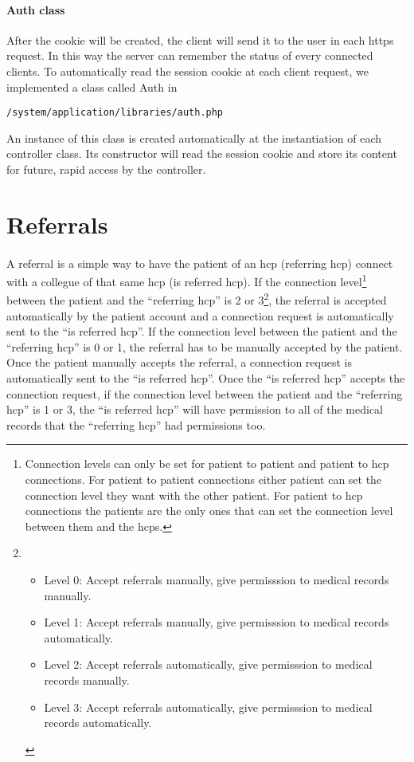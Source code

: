 \paragraph{Auth class}
After the cookie will be created, the client will send it to the user in each https request. In this way the server can remember the status of every connected clients. To automatically read the session cookie at each client request, we implemented a class called Auth in
\begin{verbatim}
/system/application/libraries/auth.php
\end{verbatim}
An instance of this class is created automatically at the instantiation of each controller class. Its constructor will read the session cookie and store its content for future, rapid access by the controller.

\section{Referrals}
\paragraph{}   A referral is a simple way to have the patient of an hcp (referring hcp) connect with a collegue of that same hcp (is referred hcp).  If the connection level\footnote{Connection levels can only be set for patient to patient and patient to hcp connections.  For patient to patient connections either patient can set the connection level they want with the other patient.  For patient to hcp connections the patients are the only ones that can set the connection level between them and the hcps.} between the patient and the ``referring hcp'' is 2 or 3\footnote{\begin{itemize} \item Level 0: Accept referrals manually, give permisssion to medical records manually.  \item Level 1: Accept referrals manually, give permisssion to medical records automatically.  \item Level 2: Accept referrals automatically, give permisssion to medical records manually.  \item Level 3: Accept referrals automatically, give permisssion to medical records automatically.\end{itemize} }, the referral is accepted automatically by the patient account and a connection request is automatically sent to the ``is referred hcp''.  If the connection level between the patient and the ``referring hcp'' is 0 or 1, the referral has to be manually accepted by the patient.  Once the patient manually accepts the referral, a connection request is automatically sent to the ``is referred hcp''.  Once the ``is referred hcp'' accepts the connection request, if the connection level between the patient and the ``referring hcp'' is 1 or 3, the ``is referred hcp'' will have permission to all of the medical records that the ``referring hcp'' had permissions too.


